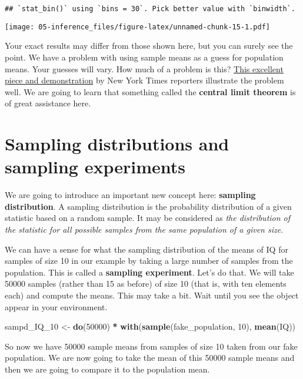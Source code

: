 \documentclass[
]{book}
\newenvironment{Shaded}{\begin{snugshade}}{\end{snugshade}}
\newcommand{\DecValTok}[1]{\textcolor[rgb]{0.00,0.00,0.81}{#1}}
\newcommand{\FunctionTok}[1]{\textcolor[rgb]{0.13,0.29,0.53}{\textbf{#1}}}
\newcommand{\NormalTok}[1]{#1}
\newcommand{\OtherTok}[1]{\textcolor[rgb]{0.56,0.35,0.01}{#1}}
\newcommand{\SpecialCharTok}[1]{\textcolor[rgb]{0.81,0.36,0.00}{\textbf{#1}}}
\begin{document}
\begin{verbatim}
## `stat_bin()` using `bins = 30`. Pick better value with `binwidth`.
\end{verbatim}

\texttt{[image: 05-inference\_files/figure-latex/unnamed-chunk-15-1.pdf]}

Your exact results may differ from those shown here, but you can surely see the point. We have a problem with using sample means as a guess for population means. Your guesses will vary. How much of a problem is this? \href{https://www.dropbox.com/s/n5hd5n0y3j48chw/NYtimes.pdf?dl=0}{This excellent piece and demonstration} by New York Times reporters illustrate the problem well. We are going to learn that something called the \textbf{central limit theorem} is of great assistance here.

\section{Sampling distributions and sampling experiments}\label{sampling-distributions-and-sampling-experiments}

We are going to introduce an important new concept here: \textbf{sampling distribution}. A sampling distribution is the probability distribution of a given statistic based on a random sample. It may be considered as \emph{the distribution of the statistic for all possible samples from the same population of a given size}.

We can have a sense for what the sampling distribution of the means of IQ for samples of size 10 in our example by taking a large number of samples from the population. This is called a \textbf{sampling experiment}. Let's do that. We will take 50000 samples (rather than 15 as before) of size 10 (that is, with ten elements each) and compute the means. This may take a bit. Wait until you see the object appear in your environment.

\begin{Shaded}
\begin{Highlighting}[]
\NormalTok{sampd\_IQ\_10 }\OtherTok{\textless{}{-}} \FunctionTok{do}\NormalTok{(}\DecValTok{50000}\NormalTok{) }\SpecialCharTok{*} \FunctionTok{with}\NormalTok{(}\FunctionTok{sample}\NormalTok{(fake\_population, }\DecValTok{10}\NormalTok{), }\FunctionTok{mean}\NormalTok{(IQ))}
\end{Highlighting}
\end{Shaded}

So now we have 50000 sample means from samples of size 10 taken from our fake population. We are now going to take the mean of this 50000 sample means and then we are going to compare it to the population mean.
\end{document}
